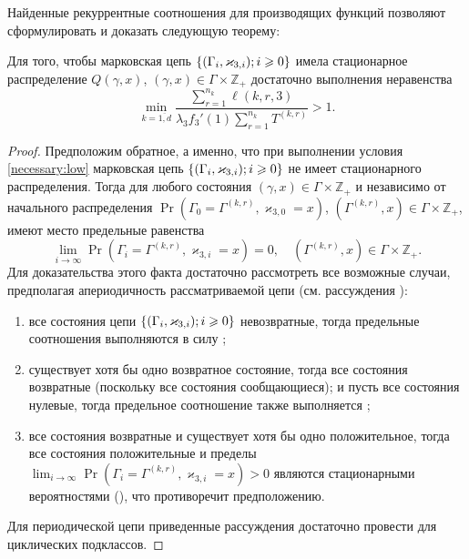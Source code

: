 \documentclass[a4paper,12pt,russian]{extarticle}
\newcommand{\MarkThree}{\{(\Gamma_i, \varkappa_{3,i}); \hm{} i \geqslant 0\}}
\begin{document}
Найденные рекуррентные соотношения для производящих функций позволяют сформулировать и доказать следующую теорему:
\begin{theorem}
Для того, чтобы марковская цепь $\MarkThree$ имела стационарное распределение $Q(\gamma,x)$, $(\gamma,x)\in \Gamma \times {\mathbb Z}_+$ достаточно выполнения неравенства 
\begin{equation}
\min_{k=\overline{1,d}} { \frac{\sum_{r = 1}^{n_k} \ell(k,r,3) }{\lambda_3 f_3'(1) \sum_{r=1}^{n_k} T^{(k,r)} }}>1.
\label{necessary:low}
\end{equation}
\end{theorem}
\begin{proof}
Предположим обратное, а именно, что при выполнении условия \eqref{necessary:low} марковская цепь $\MarkThree$ не имеет стационарного распределения. 
Тогда для любого состояния $(\gamma,x)\in \Gamma \times {\mathbb Z}_+$ и независимо от начального распределения $\Pr(\Gamma_{0}=\Gamma^{(k,r)}, \varkappa_{3,0}=x)$,
$(\Gamma^{(k,r)},x)\in \Gamma \times {\mathbb Z}_+$, 
имеют место предельные равенства 
\begin{equation}
\lim_{i \to \infty} \Pr(\Gamma_{i}=\Gamma^{(k,r)}, \varkappa_{3,i}=x) =0, \quad  (\Gamma^{(k,r)},x)\in \Gamma \times {\mathbb Z}_+.
\label{zero:limit:equations}
\end{equation} 
Для доказательства этого факта достаточно рассмотреть все возможные случаи, предполагая апериодичность рассматриваемой цепи (см. рассуждения \cite[гл. $3$, \linebreak \S~3-4]{Shiryaev}):
\begin{enumerate}
\item все состояния цепи $\MarkThree$ невозвратные, тогда предельные соотношения выполняются в силу \cite[с. 541, лемма $2$]{Shiryaev};
\item существует хотя бы одно возвратное состояние, тогда все состояния возвратные (поскольку все состояния сообщающиеся); и пусть все состояния нулевые, тогда предельное соотношение также выполняется \cite[с. 541, лемма $3$]{Shiryaev};
\item все состояния возвратные и существует хотя бы одно положительное, тогда все состояния положительные и пределы $\lim_{i \to \infty} \Pr(\Gamma_{i}=\Gamma^{(k,r)}, \varkappa_{3,i}=x) > 0$ являются стационарными вероятностями ({\cite[с. 549, теорема $1$]{Shiryaev}}), что противоречит предположению.
\end{enumerate}
Для периодической цепи приведенные рассуждения достаточно провести для циклических подклассов.


\end{proof}
\end{document}

